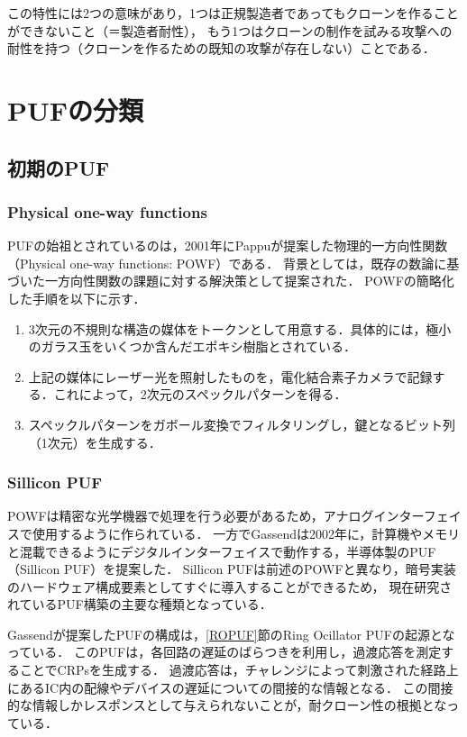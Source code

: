\documentclass[technicalreport]{ieicej} %
\begin{document}
この特性には2つの意味があり，1つは正規製造者であってもクローンを作ることができないこと（＝製造者耐性），
もう1つはクローンの制作を試みる攻撃への耐性を持つ（クローンを作るための既知の攻撃が存在しない）ことである．


\section{PUFの分類}
\subsection{初期のPUF}
\subsubsection{Physical one-way functions}
PUFの始祖とされているのは，2001年にPappuが提案した物理的一方向性関数（Physical one-way functions: POWF）\cite{pappu}である．
背景としては，既存の数論に基づいた一方向性関数の課題に対する解決策として提案された．
POWFの簡略化した手順を以下に示す．
\begin{enumerate}
  \item 3次元の不規則な構造の媒体をトークンとして用意する．具体的には，極小のガラス玉をいくつか含んだエポキシ樹脂とされている．
  \item 上記の媒体にレーザー光を照射したものを，電化結合素子カメラで記録する．これによって，2次元のスペックルパターンを得る．
  \item スペックルパターンをガボール変換でフィルタリングし，鍵となるビット列（1次元）を生成する．
\end{enumerate}

\subsubsection{Sillicon PUF}
\label{SilliconPUF}
POWFは精密な光学機器で処理を行う必要があるため，アナログインターフェイスで使用するように作られている．
一方でGassendは2002年に，計算機やメモリと混載できるようにデジタルインターフェイスで動作する，半導体製のPUF（Sillicon PUF）を提案した\cite{gassend1}．
Sillicon PUFは前述のPOWFと異なり，暗号実装のハードウェア構成要素としてすぐに導入することができるため，
現在研究されているPUF構築の主要な種類となっている．

Gassendが提案したPUF\cite{gassend1}の構成は，\ref{ROPUF}節のRing Ocillator PUFの起源となっている．
このPUFは，各回路の遅延のばらつきを利用し，過渡応答を測定することでCRPsを生成する．
過渡応答は，チャレンジによって刺激された経路上にあるIC内の配線やデバイスの遅延についての間接的な情報となる．
この間接的な情報しかレスポンスとして与えられないことが，耐クローン性の根拠となっている．
\end{document}
